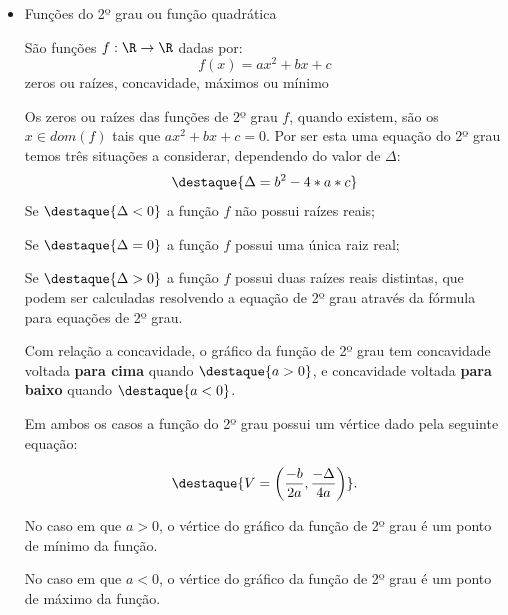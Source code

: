 \begin{itemize}
 \item Funções do 2º grau ou função quadrática

 São funções $f: \R \rightarrow \R$ dadas por:
 \[f(x)= ax^2 + bx + c\]
 {\color{red} zeros ou raízes, concavidade, máximos ou mínimo}

 Os zeros ou raízes das funções de 2º grau $f$, quando existem, são os $x \in dom(f)$ tais que $ax^2+bx+c=0$. Por ser esta uma equação do 2º grau temos três situações a considerar, dependendo do valor de $\Delta$:
 \[\destaque{\Delta= b^2 - 4*a*c}\]
 Se $\destaque{\Delta < 0}$ a função $f$ não possui raízes reais;

 Se $\destaque{\Delta = 0}$ a função $f$ possui uma única raiz real;

 Se $\destaque{\Delta > 0}$ a função $f$ possui duas raízes reais distintas, que podem ser calculadas resolvendo a equação de 2º grau através da fórmula para equações de 2º grau.

 Com relação a concavidade, o gráfico da função de 2º grau tem concavidade voltada \textbf{para cima} quando $\destaque{a > 0}$, e concavidade voltada \textbf{para baixo} quando $\destaque{a < 0}$.

 Em ambos os casos a função do 2º grau possui um vértice dado pela seguinte equação:

 \[ \destaque{V= \left(\frac{- b}{2a}, \frac{- \Delta}{4a} \right)} .\]

 No caso em que $a > 0$, o vértice do gráfico da função de 2º grau é um ponto de mínimo da função.

 No caso em que $a < 0$, o vértice do gráfico da função de 2º grau é um ponto de máximo da função.



\end{itemize}
